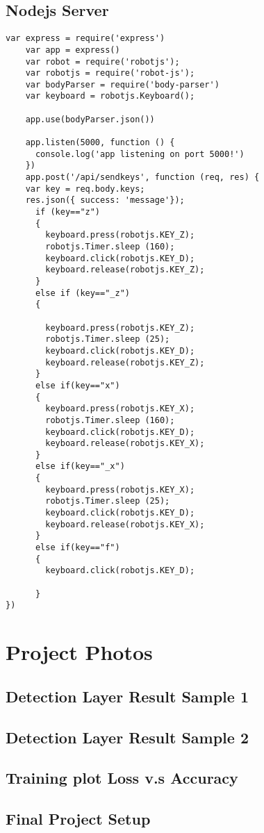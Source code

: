 \documentclass[onecolumn, draftclsnofoot,10pt, compsoc]{IEEEtran}
\begin{document}
\subsection{Nodejs Server}
\begin{lstlisting}[language=VBScript,caption=Nodejs script runs a server and listen for client request to execute keyboard commands.]
	var express = require('express')
	var app = express()
	var robot = require('robotjs');
	var robotjs = require('robot-js');
	var bodyParser = require('body-parser')
	var keyboard = robotjs.Keyboard();

	app.use(bodyParser.json())

	app.listen(5000, function () {
	  console.log('app listening on port 5000!')
	})
	app.post('/api/sendkeys', function (req, res) {
	var key = req.body.keys;
	res.json({ success: 'message'});
	  if (key=="z")
	  {
	    keyboard.press(robotjs.KEY_Z);
	    robotjs.Timer.sleep (160);
	    keyboard.click(robotjs.KEY_D);
	    keyboard.release(robotjs.KEY_Z);
	  }
	  else if (key=="_z")
	  {

	    keyboard.press(robotjs.KEY_Z);
	    robotjs.Timer.sleep (25);
	    keyboard.click(robotjs.KEY_D);
	    keyboard.release(robotjs.KEY_Z);
	  }
	  else if(key=="x")
	  {
	    keyboard.press(robotjs.KEY_X);
	    robotjs.Timer.sleep (160);
	    keyboard.click(robotjs.KEY_D);
	    keyboard.release(robotjs.KEY_X);
	  }
	  else if(key=="_x")
	  {
	    keyboard.press(robotjs.KEY_X);
	    robotjs.Timer.sleep (25);
	    keyboard.click(robotjs.KEY_D);
	    keyboard.release(robotjs.KEY_X);
	  }
	  else if(key=="f")
	  {
	    keyboard.click(robotjs.KEY_D);

	  }
})
\end{lstlisting}
\section{Project Photos}
\subsection{Detection Layer Result Sample 1}
\begin{center}
\end{center}
\subsection{Detection Layer Result Sample 2}
\begin{center}
\end{center}
\subsection{Training plot Loss v.s Accuracy}
\begin{center}
\end{center}
\subsection{Final Project Setup}
\begin{center}
\end{center}
\end{document}

